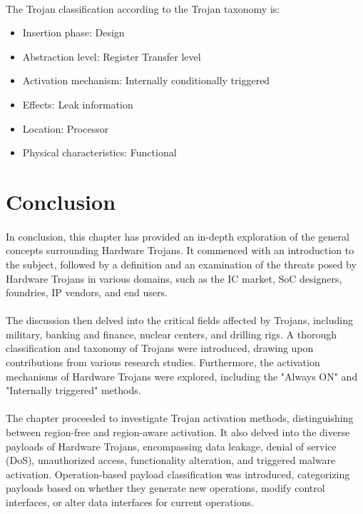  \paragraph*{}
 The Trojan classification according to the Trojan taxonomy is:
 \begin{itemize}
 	
 	\item Insertion phase: Design
 	\item Abstraction level: Register Transfer level
 	\item Activation mechanism: Internally conditionally triggered
 	\item Effects: Leak information
 	\item Location: Processor
 	\item Physical characteristics: Functional
 	
 \end{itemize}
 
 \section{Conclusion}
 \paragraph*{}
In conclusion, this chapter has provided an in-depth exploration of the general concepts surrounding Hardware Trojans. It commenced with an introduction to the subject, followed by a definition and an examination of the threats posed by Hardware Trojans in various domains, such as the IC market, SoC designers, foundries, IP vendors, and end users.
 \paragraph*{}
The discussion then delved into the critical fields affected by Trojans, including military, banking and finance, nuclear centers, and drilling rigs. A thorough classification and taxonomy of Trojans were introduced, drawing upon contributions from various research studies. Furthermore, the activation mechanisms of Hardware Trojans were explored, including the "Always ON" and "Internally triggered" methods.
 \paragraph*{}
The chapter proceeded to investigate Trojan activation methods, distinguishing between region-free and region-aware activation. It also delved into the diverse payloads of Hardware Trojans, encompassing data leakage, denial of service (DoS), unauthorized access, functionality alteration, and triggered malware activation. Operation-based payload classification was introduced, categorizing payloads based on whether they generate new operations, modify control interfaces, or alter data interfaces for current operations. 
